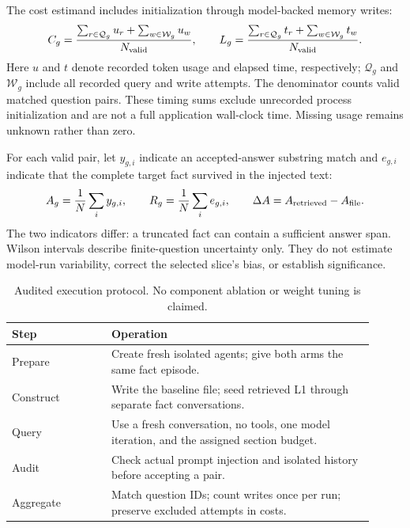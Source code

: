 The cost estimand includes initialization through model-backed memory writes:
\begin{equation}
 C_g=\frac{\sum_{r\in\mathcal{Q}_g}u_r+
                 \sum_{w\in\mathcal{W}_g}u_w}{N_{\rm valid}},\qquad
 L_g=\frac{\sum_{r\in\mathcal{Q}_g}t_r+
                 \sum_{w\in\mathcal{W}_g}t_w}{N_{\rm valid}}.
 \label{eq:accounting}
\end{equation}
Here $u$ and $t$ denote recorded token usage and elapsed time, respectively;
$\mathcal Q_g$ and $\mathcal W_g$ include all recorded query and write attempts.
The denominator counts valid matched question pairs. These timing sums exclude
unrecorded process initialization and are not a full application wall-clock time.
Missing usage remains unknown rather than zero.

For each valid pair, let $y_{g,i}$ indicate an accepted-answer substring match
and $e_{g,i}$ indicate that the complete target fact survived in the injected text:
\begin{equation}
 A_g=\frac{1}{N}\sum_i y_{g,i},\qquad
 R_g=\frac{1}{N}\sum_i e_{g,i},\qquad
 \Delta A=A_{\rm retrieved}-A_{\rm file}.
 \label{eq:metrics}
\end{equation}
The two indicators differ: a truncated fact can contain a sufficient answer span.
Wilson intervals describe finite-question uncertainty only. They do not estimate
model-run variability, correct the selected slice's bias, or establish significance.

\begin{table}[htbp]
\centering\small
\caption{Audited execution protocol. No component ablation or weight tuning is claimed.}
\label{tab:protocol}
\begin{tabular}{p{0.25\linewidth}p{0.66\linewidth}}\toprule
Step & Operation \\\midrule
Prepare & Create fresh isolated agents; give both arms the same fact episode. \\
Construct & Write the baseline file; seed retrieved L1 through separate fact conversations. \\
Query & Use a fresh conversation, no tools, one model iteration, and the assigned section budget. \\
Audit & Check actual prompt injection and isolated history before accepting a pair. \\
Aggregate & Match question IDs; count writes once per run; preserve excluded attempts in costs. \\
\bottomrule\end{tabular}\end{table}

\FloatBarrier
